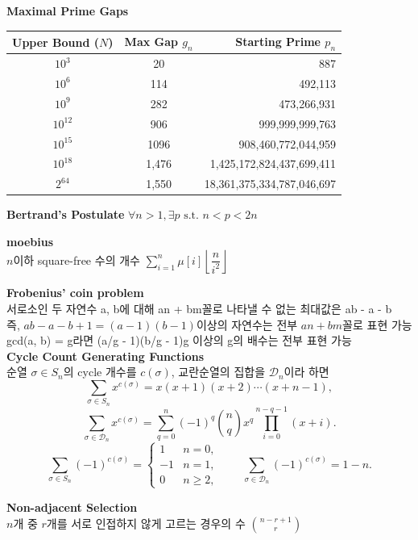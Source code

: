 \vspace{5pt}
\noindent \textbf{Maximal Prime Gaps} \\
\begin{flushleft}
\noindent
\begin{tabular}{|c|c|r|}
\hline
Upper Bound ($N$) & Max Gap $g_n$ & Starting Prime $p_n$ \\ \hline
$10^3$ & 20 & 887 \\ \hline
$10^6$ & 114 & 492,113 \\ \hline
$10^9$ & 282 & 473,266,931 \\ \hline
$10^{12}$ & 906 & 999,999,999,763 \\ \hline
$10^{15}$ & 1096 & 908,460,772,044,959 \\ \hline
$10^{18}$ & 1,476 & 1,425,172,824,437,699,411 \\ \hline
$2^{64}$ & 1,550 & 18,361,375,334,787,046,697 \\ \hline
\end{tabular}
\end{flushleft}

\vspace{5pt}
\noindent \textbf{Bertrand's Postulate}
$\forall n > 1, \exists p \text{ s.t. } n < p < 2n$

\vspace{5pt}
\noindent \textbf{moebius} \\
$n$이하 square-free 수의 개수 $\displaystyle\sum_{i=1}^{n} \mu[i] \left\lfloor \dfrac{n}{i^2} \right\rfloor$   

\vspace{5pt}
\noindent \textbf{Frobenius' coin problem} \\
서로소인 두 자연수 a, b에 대해 an + bm꼴로 나타낼 수 없는 최대값은 ab - a - b \\
즉, $ab - a - b + 1 = (a-1)(b-1)$이상의 자연수는 전부 $an+bm$꼴로 표현 가능 \\
gcd(a, b) = g라면 (a/g - 1)(b/g - 1)g 이상의 g의 배수는 전부 표현 가능 \\

\vspace{5pt}
\noindent \textbf{Cycle Count Generating Functions} \\
순열 $\sigma \in S_n$의 cycle 개수를 $c(\sigma)$, 교란순열의 집합을 $\mathcal{D}_n$이라 하면
\[
\sum_{\sigma \in S_n} x^{c(\sigma)}
=
x(x+1)(x+2)\cdots(x+n-1),
\]
\[
\sum_{\sigma \in \mathcal{D}_n} x^{c(\sigma)}
=
\sum_{q=0}^{n}(-1)^q\binom{n}{q}x^q
\prod_{i=0}^{n-q-1}(x+i).
\]
\[
\sum_{\sigma \in S_n}(-1)^{c(\sigma)}
=
\begin{cases}
1 & n=0,\\
-1 & n=1,\\
0 & n\ge 2,
\end{cases}
\qquad
\sum_{\sigma \in \mathcal{D}_n}(-1)^{c(\sigma)}
=
1-n.
\]

\vspace{5pt}
\noindent \textbf{Non-adjacent Selection} \\
$n$개 중 $r$개를 서로 인접하지 않게 고르는 경우의 수 $\displaystyle \binom{n-r+1}{r}$